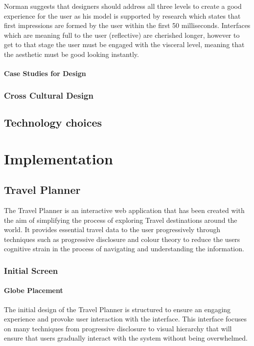 \documentclass[]{project_final}
\begin{document}
Norman suggests that designers should address all three levels to create a good experience for the user as his model is supported by research which states that first impressions are formed by the user within the first 50 milliseconds. Interfaces which are meaning full to the user (reflective) are cherished longer, however to get to that stage the user must be engaged with the visceral level, meaning that the aesthetic must be good looking instantly.

\subsubsection{Case Studies for Design}

\subsection{Cross Cultural Design}


\section{Technology choices}


\chapter{Implementation}
\section{Travel Planner}
The Travel Planner is an interactive web application that has been created with the aim
of simplifying the process of exploring Travel destinations around the world. It provides
essential travel data to the user progressively through techniques such as progressive disclosure and colour theory to reduce the users cognitive strain in the process of navigating and understanding the information.

\subsection{Initial Screen}
\subsubsection{Globe Placement}
The initial design of the Travel Planner is structured to ensure an engaging experience and provoke user interaction with the interface. This interface focuses on many techniques from progressive disclosure to visual hierarchy that will ensure that users gradually interact with the system without being overwhelmed.
\end{document}
